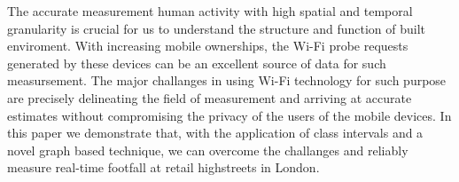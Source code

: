 The accurate measurement human activity with high spatial and temporal granularity is crucial for us to understand the structure and function of built enviroment.
With increasing mobile ownerships, the Wi-Fi probe requests generated by these devices can be an excellent source of data for such measursement.
The major challanges in using Wi-Fi technology for such purpose are precisely delineating the field of measurement and arriving at accurate estimates without compromising the privacy of the users of the mobile devices.
In this paper we demonstrate that, with the application of class intervals and a novel graph based technique, we can overcome the challanges and reliably measure real-time footfall at retail highstreets in London.
